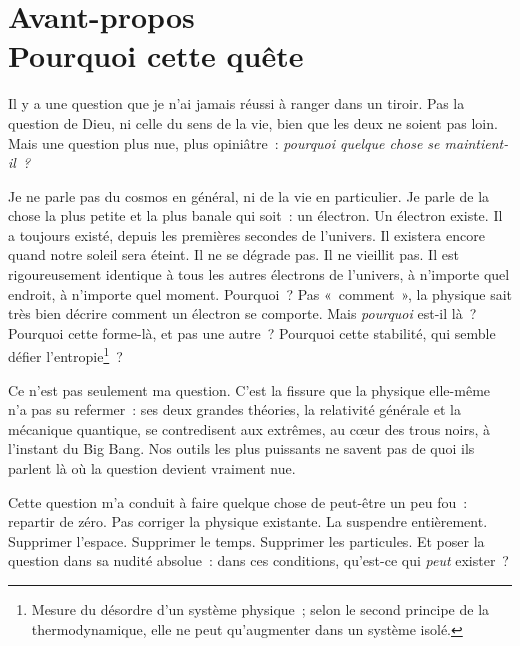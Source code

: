 \documentclass[12pt, a4paper, openright]{book}
\begin{document}
\frontmatter
\tableofcontents
\newpage

\mainmatter

\chapter*{Avant-propos \\ Pourquoi cette quête}

Il y a une question que je n'ai jamais réussi à ranger dans un tiroir. Pas la question de Dieu, ni celle du sens de la vie, bien que les deux ne soient pas loin. Mais une question plus nue, plus opiniâtre~: \emph{pourquoi quelque chose se maintient-il~?}

\medskip

Je ne parle pas du cosmos en général, ni de la vie en particulier. Je parle de la chose la plus petite et la plus banale qui soit~: un électron. Un électron existe. Il a toujours existé, depuis les premières secondes de l'univers. Il existera encore quand notre soleil sera éteint. Il ne se dégrade pas. Il ne vieillit pas. Il est rigoureusement identique à tous les autres électrons de l'univers, à n'importe quel endroit, à n'importe quel moment. Pourquoi~? Pas «~comment~», la physique sait très bien décrire comment un électron se comporte. Mais \emph{pourquoi} est-il là~? Pourquoi cette forme-là, et pas une autre~? Pourquoi cette stabilité, qui semble défier l'entropie\footnote{Mesure du désordre d'un système physique~; selon le second principe de la thermodynamique, elle ne peut qu'augmenter dans un système isolé.}~?

\medskip

Ce n'est pas seulement ma question. C'est la fissure que la physique elle-même n'a pas su refermer~: ses deux grandes théories, la relativité générale et la mécanique quantique, se contredisent aux extrêmes, au cœur des trous noirs, à l'instant du Big Bang. Nos outils les plus puissants ne savent pas de quoi ils parlent là où la question devient vraiment nue.

\medskip

Cette question m'a conduit à faire quelque chose de peut-être un peu fou~: repartir de zéro. Pas corriger la physique existante. La suspendre entièrement. Supprimer l'espace. Supprimer le temps. Supprimer les particules. Et poser la question dans sa nudité absolue~: dans ces conditions, qu'est-ce qui \emph{peut} exister~?
\end{document}
